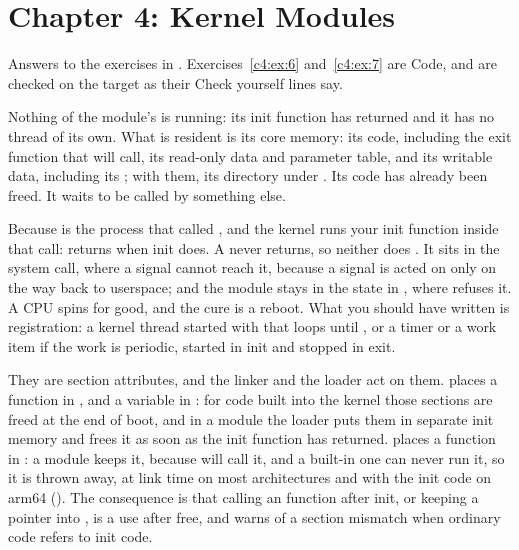 
\section{Chapter 4: Kernel Modules}
\label{sol:sec:c4}
Answers to the exercises in . Exercises~\ref{c4:ex:6} and~\ref{c4:ex:7}
are Code, and are checked on the target as their Check yourself lines say.


 Nothing of the module's is running: its init function has returned and it has no thread
of its own. What is resident is its core memory: its code, including the exit function that
 will call, its read-only data and parameter table, and its writable data, including
its ; with them, its directory under . Its  code
has already been freed. It waits to be called by something else.

 Because  is the process that called , and the kernel
runs your init function inside that call:  returns when init does. A 
never returns, so neither does . It sits in the system call, where a signal cannot
reach it, because a signal is acted on only on the way back to userspace; and the module stays in
the  state in , where  refuses it. A CPU spins for
good, and the cure is a reboot. What you should have written is registration: a kernel thread
started with  that loops until , or a timer or a
work item if the work is periodic, started in init and stopped in exit.

 They are section attributes, and the linker and the loader act on them. 
places a function in , and  a variable in : for
code built into the kernel those sections are freed at the end of boot, and in a module the loader
puts them in separate init memory and frees it as soon as the init function has returned.
 places a function in : a module keeps it, because  will
call it, and a built-in one can never run it, so it is thrown away, at link time on most
architectures and with the init code on arm64 (). The consequence is that calling
an  function after init, or keeping a pointer into , is a use after
free, and  warns of a section mismatch when ordinary code refers to init code.

